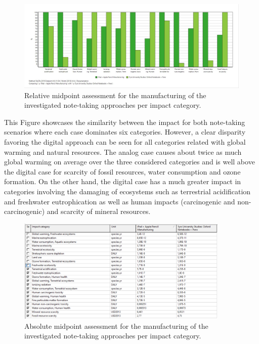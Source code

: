 \begin{figure}[H]
    \centering
    \includegraphics[width=\textwidth]{images/Manufacturing/Characterization_Manufacturing.JPG}
    \caption{Relative midpoint assessment for the manufacturing of the investigated note-taking approaches per impact category.}\label{fig:characterization_manufacturing}
\end{figure}

This Figure showcases the similarity between the impact for both note-taking scenarios where each case dominates six categories. However, a clear disparity favoring the digital approach can be seen for all categories related with global warming and natural resources. The analog case causes about twice as much global warming on average over the three considered categories and is well above the digital case for scarcity of fossil resources, water consumption and ozone formation. On the other hand, the digital case has a much greater impact in categories involving the damaging of ecosystems such as terrestrial acidification and freshwater eutrophication as well as human impacts (carcinogenic and non-carcinogenic) and scarcity of mineral resources.

\begin{figure}[H]
    \centering
    \includegraphics[width=0.9\textwidth]{images/Manufacturing/Characterization_Table_Manufacturing.PNG}
    \caption{Absolute midpoint assessment for the manufacturing of the investigated note-taking approaches per impact category.}\label{fig:characterization_table_manufacturing}
\end{figure}

